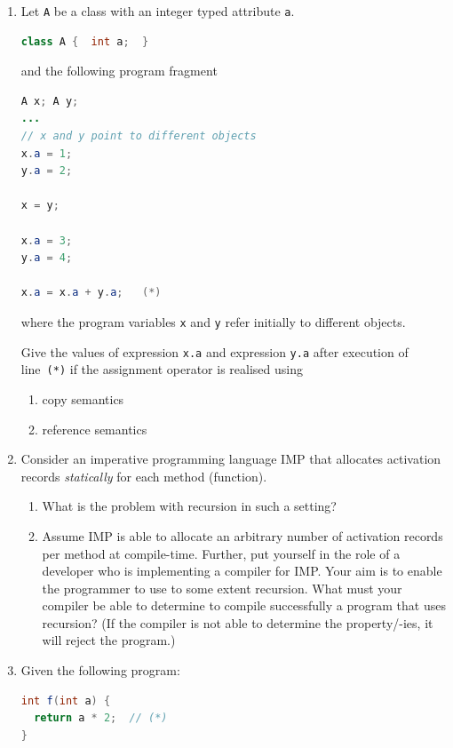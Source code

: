 \documentclass{article}
\begin{document}
\begin{enumerate}
\item Let \lstinline!A! be a class with an integer typed attribute
  \lstinline!a!.
\begin{lstlisting}[language=Java, columns=flexible]
class A {  int a;  }
\end{lstlisting}

and the following program fragment
\begin{lstlisting}[language=Java, columns=flexible] 
A x; A y;
...
// x and y point to different objects
x.a = 1;
y.a = 2;

x = y;

x.a = 3;
y.a = 4;
      
x.a = x.a + y.a;   (*)
\end{lstlisting}
where the program variables \lstinline!x! and \lstinline!y! refer
initially to different objects.

Give the values of expression \lstinline!x.a! and expression
\lstinline!y.a! after execution of line~\lstinline!(*)! if the
assignment operator is realised using
\begin{enumerate}
  \item copy semantics 
  \item reference semantics 
\end{enumerate}
\item Consider an imperative programming language \textsf{IMP} that
  allocates activation records \emph{statically} for each method
  (function). 
  \begin{enumerate}
  \item What is the problem with recursion in such a setting?  
  \item Assume \textsf{IMP} is able to allocate an arbitrary number of
    activation records per method at compile-time. Further, put
    yourself in the role of a developer who is implementing a compiler
    for \textsf{IMP}. Your aim is to enable the programmer to use to
    some extent recursion. What must your compiler be able to
    determine to compile successfully a program that uses recursion?
    (If the compiler is not able to determine the property/-ies, it
    will reject the program.)
 \end{enumerate}
\item Given the following program:
\begin{lstlisting}[language=Java, columns=flexible] 
int f(int a) {
  return a * 2;  // (*)
} 


\end{lstlisting}
\end{enumerate}
\end{document}
